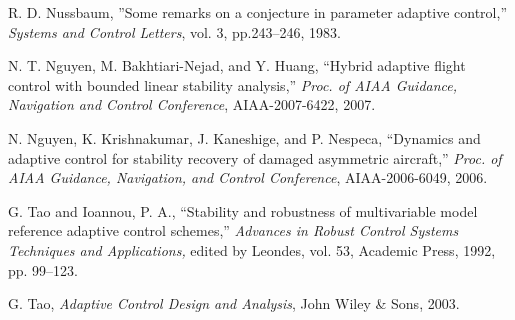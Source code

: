 \documentclass[letterpaper, 10 pt, conference]{ieeeconf}
\begin{document}
\begin{thebibliography}{199}
 R. D. Nussbaum, ''Some remarks on a
  conjecture in parameter adaptive control,'' {\it
    Systems and Control Letters}, vol. 3,
  pp.243--246, 1983.




 N. T. Nguyen, M. Bakhtiari-Nejad,
  and Y. Huang, ``Hybrid adaptive flight control
  with bounded linear stability analysis,'' {\it
    Proc. of AIAA Guidance, Navigation and
    Control Conference}, AIAA-2007-6422, 2007.


 N. Nguyen, K. Krishnakumar,
  J. Kaneshige, and P. Nespeca, ``Dynamics and
  adaptive control for stability recovery of
  damaged asymmetric aircraft,'' {\it Proc.
    of AIAA Guidance, Navigation, and Control
    Conference}, AIAA-2006-6049, 2006.


 G. Tao and Ioannou, P. A.,
  ``Stability and robustness of multivariable
  model reference adaptive control schemes,'' {\it
    Advances in Robust Control Systems Techniques
    and Applications,} edited by Leondes, vol. 53,
  Academic Press, 1992, pp. 99--123.

 G. Tao, {\it Adaptive Control Design
    and Analysis}, John Wiley \& Sons, 2003.




\end{thebibliography}
\end{document}
